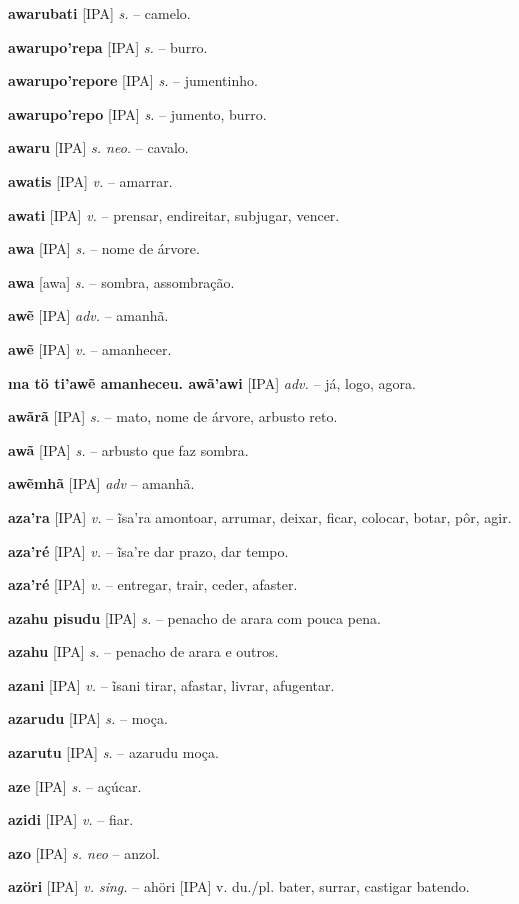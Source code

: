 \textbf{awarubati} [IPA] \textit{s.} -- camelo.

\textbf{awarupo'repa} [IPA] \textit{s.} -- burro.

\textbf{awarupo'repore} [IPA] \textit{s.} -- jumentinho.

\textbf{awarupo'repo} [IPA] \textit{s.} -- jumento, burro.

\textbf{awaru} [IPA] \textit{s. neo.} -- cavalo.

\textbf{awatis} [IPA] \textit{v.} -- amarrar.

\textbf{awati} [IPA] \textit{v.} -- prensar, endireitar, subjugar, vencer.

\textbf{awa} [IPA] \textit{s.} -- nome de árvore.

\textbf{awa} [awa] \textit{s.} -- sombra, assombração.

\textbf{awẽ} [IPA] \textit{adv.} -- amanhã.

\textbf{awẽ} [IPA] \textit{v.} -- amanhecer.

\textbf{ma tö ti'awẽ amanheceu. awã'awi} [IPA] \textit{adv.} -- já, logo, agora.

\textbf{awãrã} [IPA] \textit{s.} -- mato, nome de árvore, arbusto reto.

\textbf{awã} [IPA] \textit{s.} -- arbusto que faz sombra.

\textbf{awẽmhã} [IPA] \textit{adv} -- {amanhã}.

\textbf{aza'ra} [IPA] \textit{v.} -- ĩsa'ra amontoar, arrumar, deixar, ficar, colocar, botar, pôr, agir.

\textbf{aza'ré} [IPA] \textit{v.} -- ĩsa're dar prazo, dar tempo.

\textbf{aza'ré} [IPA] \textit{v.} -- entregar, trair, ceder, afaster.

\textbf{azahu pisudu} [IPA] \textit{s.} -- penacho de arara com pouca pena.

\textbf{azahu} [IPA] \textit{s.} -- penacho de arara e outros.

\textbf{azani} [IPA] \textit{v.} -- ĩsani tirar, afastar, livrar, afugentar.

\textbf{azarudu} [IPA] \textit{s.} -- moça.

\textbf{azarutu} [IPA] \textit{s.} -- azarudu moça.

\textbf{aze} [IPA] \textit{s.} -- açúcar.

\textbf{azidi} [IPA] \textit{v.} -- fiar.

\textbf{azo} [IPA] \textit{s. neo} -- anzol.

\textbf{azöri} [IPA] \textit{v. sing.} -- ahöri [IPA] v. du./pl. bater, surrar, castigar batendo.

